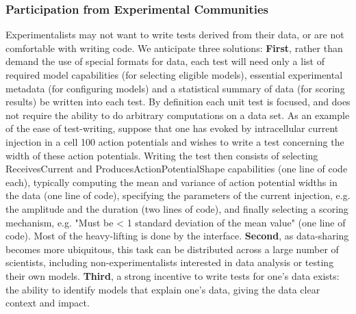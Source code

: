 \documentclass[11pt,letterpaper]{article}
\begin{document}
\subsubsection{Participation from Experimental Communities}
Experimentalists may not want to write tests derived from their data, or are not comfortable with writing code.  We anticipate three solutions: \textbf{First}, rather than demand the use of special formats for data, each test will need only a list of required model capabilities (for selecting eligible models), essential experimental metadata (for configuring models) and a statistical summary of data (for scoring results) be written into each test.  By definition each unit test is focused, and does not require the ability to do arbitrary computations on a data set.  As an example of the ease of test-writing, suppose that one has evoked by intracellular current injection in a cell 100 action potentials and wishes to write a test concerning the width of these action potentials.  Writing the test then consists of selecting ReceivesCurrent and ProducesActionPotentialShape capabilities (one line of code each), typically computing the mean and variance of action potential widths in the data (one line of code), specifying the parameters of the current injection, e.g. the amplitude and the duration (two lines of code), and finally selecting a scoring mechanism, e.g. "Must be < 1 standard deviation of the mean value" (one line of code).  Most of the heavy-lifting is done by the interface.  \textbf{Second}, as data-sharing becomes more ubiquitous, this task can be distributed across a large number of scientists, including non-experimentalists interested in data analysis or testing their own models.  \textbf{Third}, a strong incentive to write tests for one's data exists: the ability to identify models that explain one's data, giving the data clear context and impact. 
\end{document}
